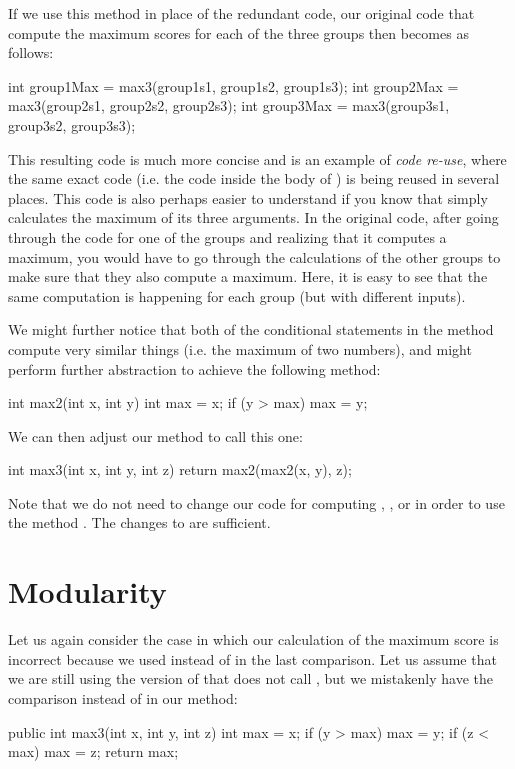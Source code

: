 If we use this method in place of the redundant code,
our original code that compute the maximum scores for each of the three
groups then becomes as follows:
\begin{code}
int group1Max = max3(group1s1, group1s2, group1s3);
int group2Max = max3(group2s1, group2s2, group2s3);
int group3Max = max3(group3s1, group3s2, group3s3);
\end{code}
This resulting code is much more concise and is an example
of \emph{code re-use}, where the same exact code
(i.e. the code inside the body of ) is being reused
in several places. This code is also perhaps easier to understand
if you know that  simply calculates the maximum
of its three arguments. In the original code, after
going through the code for one of the groups
and realizing that it computes a maximum, you
would have to go through the calculations of the other
groups to make sure that they also compute a maximum.
Here, it is easy to see that the same computation is happening
for each group (but with different inputs).

We might further notice that both of the conditional statements
in the  method
compute very similar things (i.e. the maximum of two numbers),
and might perform further abstraction to achieve the following
method:
\begin{code}
int max2(int x, int y) {
  int max = x;
  if (y > max) {
    max = y; 
  }
}
\end{code}

We can then adjust our  method to call this one:
\begin{code}
int max3(int x, int y, int z) {
  return max2(max2(x, y), z);
}
\end{code}

Note that we do not need to change our code
for computing , ,
or  in order to use the method
. The changes to  are sufficient.

\section{Modularity}
Let us again consider the case in which our calculation of the maximum
score is incorrect because we used \ic{<} instead of \ic{>} in
the last comparison. Let us assume that we are still using the
version of  that does not call , but
we mistakenly have the comparison  instead of
 in our method:
\begin{code}
public int max3(int x, int y, int z) {
  int max = x;
  if (y > max) {
    max = y;
  }
  if (z < max) {
    max = z;
  }
  return max;
}
\end{code}

